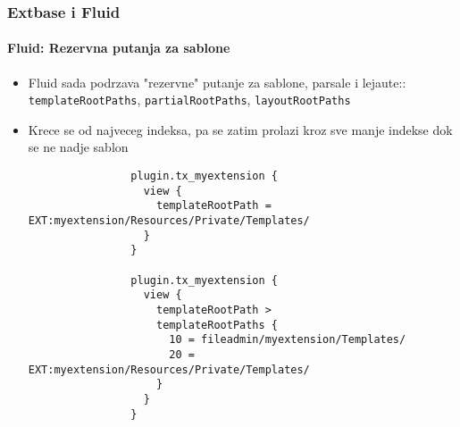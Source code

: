 \begin{frame}[fragile]
	\frametitle{Extbase i Fluid}
	\framesubtitle{Fluid: Rezervna putanja za sablone}

	\lstset{
		basicstyle=\tiny\ttfamily
	}

	\begin{itemize}
		\item Fluid sada podrzava "rezervne" putanje za sablone, parsale i lejaute::\newline
			\smaller\texttt{templateRootPaths}, \texttt{partialRootPaths}, \texttt{layoutRootPaths}\normalsize
		\item Krece se od najveceg indeksa, pa se zatim prolazi kroz sve manje indekse dok se ne nadje sablon

			\begin{lstlisting}
				plugin.tx_myextension {
				  view {
				    templateRootPath = EXT:myextension/Resources/Private/Templates/
				  }
				}

				plugin.tx_myextension {
				  view {
				    templateRootPath >
				    templateRootPaths {
				      10 = fileadmin/myextension/Templates/
				      20 = EXT:myextension/Resources/Private/Templates/
				    }
				  }
				}
			\end{lstlisting}

	\end{itemize}

\end{frame}


